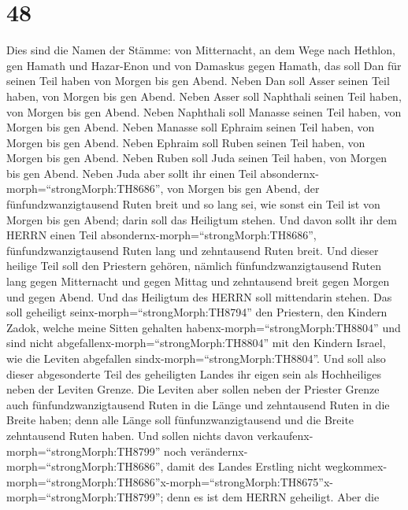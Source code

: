 \hypertarget{section-47}{%
\section{48}\label{section-47}}

 Dies sind die Namen der Stämme: von Mitternacht, an dem
Wege nach Hethlon, gen Hamath und Hazar-Enon und von Damaskus gegen
Hamath, das soll Dan für seinen Teil haben von Morgen bis gen Abend.
 Neben Dan soll Asser seinen Teil haben, von Morgen bis gen
Abend.  Neben Asser soll Naphthali seinen Teil haben, von
Morgen bis gen Abend.  Neben Naphthali soll Manasse seinen
Teil haben, von Morgen bis gen Abend.  Neben Manasse soll
Ephraim seinen Teil haben, von Morgen bis gen Abend.  Neben
Ephraim soll Ruben seinen Teil haben, von Morgen bis gen Abend.
 Neben Ruben soll Juda seinen Teil haben, von Morgen bis gen
Abend.  Neben Juda aber sollt ihr einen Teil
absondernx-morph=``strongMorph:TH8686'', von Morgen bis gen Abend, der
fünfundzwanzigtausend Ruten breit und so lang sei, wie sonst ein Teil
ist von Morgen bis gen Abend; darin soll das Heiligtum stehen.
 Und davon sollt ihr dem HERRN einen Teil
absondernx-morph=``strongMorph:TH8686'', fünfundzwanzigtausend Ruten
lang und zehntausend Ruten breit.  Und dieser heilige Teil
soll den Priestern gehören, nämlich fünfundzwanzigtausend Ruten lang
gegen Mitternacht und gegen Mittag und zehntausend breit gegen Morgen
und gegen Abend. Und das Heiligtum des HERRN soll mittendarin stehen.
 Das soll geheiligt seinx-morph=``strongMorph:TH8794'' den
Priestern, den Kindern Zadok, welche meine Sitten gehalten
habenx-morph=``strongMorph:TH8804'' und sind nicht
abgefallenx-morph=``strongMorph:TH8804'' mit den Kindern Israel, wie die
Leviten abgefallen sindx-morph=``strongMorph:TH8804''.  Und
soll also dieser abgesonderte Teil des geheiligten Landes ihr eigen sein
als Hochheiliges neben der Leviten Grenze.  Die Leviten
aber sollen neben der Priester Grenze auch fünfundzwanzigtausend Ruten
in die Länge und zehntausend Ruten in die Breite haben; denn alle Länge
soll fünfunzwanzigtausend und die Breite zehntausend Ruten haben.
 Und sollen nichts davon
verkaufenx-morph=``strongMorph:TH8799'' noch
verändernx-morph=``strongMorph:TH8686'', damit des Landes Erstling nicht
wegkommex-morph=``strongMorph:TH8686''\textbar x-morph=``strongMorph:TH8675''x-morph=``strongMorph:TH8799'';
denn es ist dem HERRN geheiligt.  Aber die
